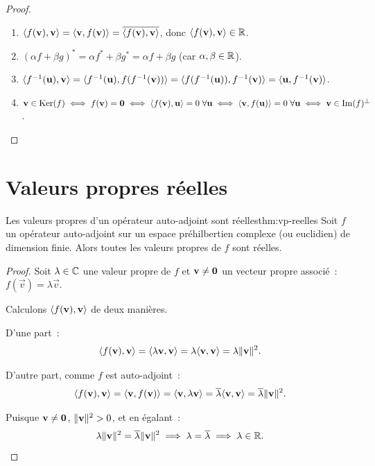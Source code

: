 \begin{proof}\leavevmode
  \begin{enumerate}[label=(\roman*)]
    \item $\langle f(\mathbf{v}), \mathbf{v}\rangle = \langle\mathbf{v}, f(\mathbf{v})\rangle
      = \overline{\langle f(\mathbf{v}), \mathbf{v}\rangle}$, donc
      $\langle f(\mathbf{v}), \mathbf{v}\rangle \in {\mathbb{R}}$.
    \item $(\alpha f + \beta g)^* = \alpha f^* + \beta g^*
      = \alpha f + \beta g$ (car $\alpha, \beta \in {\mathbb{R}}$).
    \item $\langle{f}^{-1}(\mathbf{u}), \mathbf{v}\rangle
      = \langle{f}^{-1}(\mathbf{u}), f({f}^{-1}(\mathbf{v}))\rangle
      = \langle f({f}^{-1}(\mathbf{u})), {f}^{-1}(\mathbf{v})\rangle
      = \langle\mathbf{u}, {f}^{-1}(\mathbf{v})\rangle$.
    \item $\mathbf{v} \in \operatorname{Ker}(f) \iff f(\mathbf{v}) = \mathbf{0}
      \iff \langle f(\mathbf{v}), \mathbf{u}\rangle = 0 \;\forall \mathbf{u}
      \iff \langle\mathbf{v}, f(\mathbf{u})\rangle = 0 \;\forall \mathbf{u}
      \iff \mathbf{v} \in \operatorname{Im}(f)^\perp$. \qedhere
  \end{enumerate}
\end{proof}

\section{Valeurs propres réelles}\label{sec:vp-reelles}

\begin{theorem}{Les valeurs propres d'un opérateur auto-adjoint sont réelles}{thm:vp-reelles}
  Soit $f$ un opérateur auto-adjoint sur un espace préhilbertien
  complexe (ou euclidien) de dimension
  finie. Alors toutes les valeurs propres de $f$ sont réelles.
\end{theorem}

\begin{proof}
  Soit $\lambda \in {\mathbb{C}}$ une valeur propre de $f$ et $\mathbf{v} \neq \mathbf{0}$
  un vecteur propre associé~: $f(\vec{v}) = \lambda \vec{v}$.

  Calculons $\langle f(\mathbf{v}), \mathbf{v}\rangle$ de deux manières.

  D'une part~:
  \[
    \langle f(\mathbf{v}), \mathbf{v}\rangle = \langle\lambda \mathbf{v}, \mathbf{v}\rangle
    = \lambda \langle\mathbf{v}, \mathbf{v}\rangle = \lambda \lVert\mathbf{v}\rVert^2.
  \]

  D'autre part, comme $f$ est auto-adjoint~:
  \[
    \langle f(\mathbf{v}), \mathbf{v}\rangle = \langle\mathbf{v}, f(\mathbf{v})\rangle
    = \langle\mathbf{v}, \lambda \mathbf{v}\rangle
    = \overline{\lambda} \langle\mathbf{v}, \mathbf{v}\rangle
    = \overline{\lambda} \lVert\mathbf{v}\rVert^2.
  \]

  Puisque $\mathbf{v} \neq \mathbf{0}$, $\lVert\mathbf{v}\rVert^2 > 0$, et en égalant~:
  \[
    \lambda \lVert\mathbf{v}\rVert^2 = \overline{\lambda} \lVert\mathbf{v}\rVert^2
    \implies \lambda = \overline{\lambda}
    \implies \lambda \in {\mathbb{R}}. \qedhere
  \]
\end{proof}

